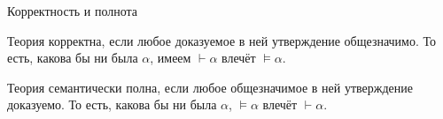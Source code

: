 \documentclass[aspectratio=169]{beamer}
\begin{document}
\begin{frame}{Корректность и полнота}
\begin{defrus}
Теория корректна, если любое доказуемое в ней утверждение общезначимо.
То есть, какова бы ни была $\alpha$, имеем $\vdash\alpha$ влечёт $\models\alpha$.
\end{defrus}

\begin{defrus}
Теория семантически полна, если любое общезначимое в ней утверждение доказуемо.
То есть, какова бы ни была $\alpha$, $\models\alpha$ влечёт $\vdash\alpha$.
\end{defrus}
\end{frame}

\begin{comment}
\begin{frame}{Корректность исчисления высказываний}
\begin{thmrus}[корректность]
Если $\vdash\alpha$, то $\models\alpha$
\end{thmrus}

\begin{proof}
Индукция по длине вывода $n$.
\begin{itemize}
\item База, $n=1$ --- частный случай перехода (без правила Modus Ponens)
\item Переход. Пусть для любого доказательства длины $n$ формула $\delta_n$ общезначима.
Тогда рассмотрим обоснование $\delta_{n+1}$ и разберём случаи:
\begin{enumerate}
\item Аксиома --- убедиться, что все аксиомы общезначимы.
\item Modus Ponens $j$, $k$ --- убедиться, что если $\models\delta_j$ и 
$\models\delta_j\rightarrow\delta_{n+1}$, то $\models\delta_{n+1}$.
\end{enumerate}
\end{itemize}
\end{proof}
\end{frame}

\begin{frame}{Общезначимость схемы аксиом №9}
Общезначимость схемы аксиом --- истинность каждой аксиомы, задаваемой данной схемой, при любой оценке:
$$\llbracket(\alpha\rightarrow\beta)\rightarrow(\alpha\rightarrow\neg\beta)\rightarrow\neg\alpha\rrbracket
   = \textnormal{И}$$

Построим таблицу истинности формулы в зависимости от оценки $\alpha$ и $\beta$:
\vspace{0.3cm}


\end{comment}
\end{document}
